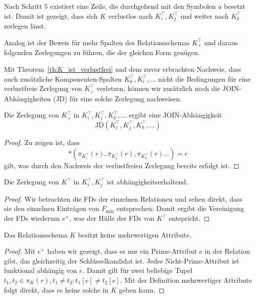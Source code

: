 \bigskip
\noindent
Nach Schritt 5 existiert eine Zeile, die durchgehend mit den Symbolen $a$ besetzt ist.
Damit ist gezeigt, dass sich $K$ verlustlos nach $K^{\top}_i, K^{\top}_j$ und weiter nach $K^{\top}_k$ zerlegen lässt.

\noindent
Analog ist der Beweis für mehr Spalten des Relationsschemas $K_{+}^\top$ und daraus folgenden Zerlegungen zu führen, die der gleichen Form genügen.

\noindent
Mit Theorem~\ref{th:K_ist_verlustfrei} und dem zuvor erbrachten Nachweis, dass auch zusätzliche Komponenten-Spalten $K_k^\top, K_l^\top, \ldots$ nicht die Bedingungen für eine verlustfreie Zerlegung von $K_{+}^\top$ verletzen, können wir zusätzlich noch die JOIN-Abhängigkeiten (JD) für eine solche Zerlegung nachweisen.

\bigskip
\begin{theorem}\label{th:k_joinabhaengigkeiten}
    Die Zerlegung von $K_{+}^\top$ in $K_i^\top, K_j^\top, K_k^\top, \ldots$ ergibt eine JOIN-Abhängigkeit
    \[
        \text{JD}(K^\top_i, K^\top_j, K^\top_k, \ldots)
    \]
\end{theorem}
\begin{proof}
    Zu zeigen ist, dass
    \[
        *(\pi_{K_i^\top}(r), \pi_{K_j^\top}(r), \pi_{K_k^\top}(r)\ldots) = r
    \]
    gilt, was durch den Nachweis der verlustfreien Zerlegung bereits erfolgt ist.
\end{proof}


\bigskip
\begin{theorem}\label{th:k_abhaengigkeitserhalten}
    Die Zerlegung von $K^\top$ in $K_i^\top, K_j^\top$ ist abhängigkeitserhaltend.
\end{theorem}
\begin{proof}
    Wir betrachten die FDs der einzelnen Relationen und sehen direkt, dass sie den einzelnen Einträgen von $F_{\text{min}}$ entsprechen:
    Damit ergibt die Vereinigung der FDs wiederum $e^+$, was der Hülle der FDs von $K^\top$ entspricht.
\end{proof}

\bigskip
\begin{theorem}\label{th:k_merwertige_attribute}
    Das Relationsschema $K$ besitzt keine mehrwertigen Attribute.
\end{theorem}
\begin{proof}
    Mit $e^+$ haben wir gezeigt, dass es nur ein Prime-Attribut $e$ in der Relation gibt, das gleichzeitig der Schlüsselkandidat ist.
    Jedes Nicht-Prime-Attribut ist funktional abhängig von $e$.
    Damit gilt für zwei beliebige Tupel $t_1, t_2 \in \pi_{K}(r), t_1 \neq t_2: t_1[e] \neq t_2[e]$.
    Mit der Definition mehrwertiger Attribute folgt direkt, dass es keine solche in $K$ geben kann.
\end{proof}

